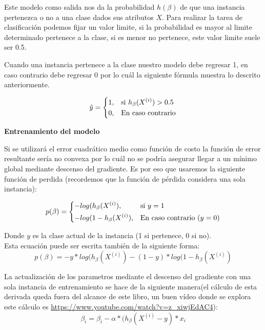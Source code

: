 \documentclass[11pt,fleqn]{book} %
\begin{document}
Este modelo como salida nos da la probabilidad $h(\beta)$ de que una instancia pertenezca o no a una clase dados sus atributos $X$. Para realizar la tarea de clasificación podemos fijar un valor limite, si la probabilidad es mayor al limite determinado pertenece a la clase, si es menor no pertenece, este valor limite suele ser 0.5.

Cuando una instancia pertenece a la clase nuestro modelo debe regresar 1, en caso contrario debe regresar 0 por lo cuál la siguiente fórmula muestra lo descrito anteriormente.

\begin{equation}
\label{eqn:prob_reg_logistica}
    \hat{y} = 
\begin{dcases}
    1,& \text{si } h_\beta(X^{(i)}) > 0.5 \\
    0,& \text{En caso contrario}
\end{dcases} 
\end{equation}

\textbf{Entrenamiento del modelo}

Si se utilizará el error cuadrático medio como función de costo la función de error resultante sería no convexa por lo cuál no se podría asegurar llegar a un mínimo global mediante descenso del gradiente. Es por eso que usaremos la siguiente función de perdida (recordemos que la función de pérdida considera una sola instancia):

\begin{equation}
    p( \beta ) = 
\begin{dcases}
    -log(h_\beta(X^{(i)}),& \text{si } y = 1\\
    -log(1-h_\beta(X^{(i)}),& \text{En caso contrario } (y=0)
\end{dcases} 
\label{eqn:costo_reg_logistica} 
\end{equation}

Donde $y$ es la clase actual de la instancia (1 si pertenece, 0 si no).\\
Esta ecuación puede ser escrita también de la siguiente forma:
\begin{equation}
    p( \beta ) = - y*log(h_\beta(X^{(i)}) - (1-y)*log(1-h_\beta(X^{(i)})
\label{eqn:costo_reg_logistica2} 
\end{equation}

La actualización de los parametros mediante el descenso del gradiente con una sola instancia de entrenamiento se hace de la siguiente manera(el cálculo de esta derivada queda fuera del alcance de este libro, un buen vídeo donde se explora este cálculo es \url{https://www.youtube.com/watch?v=z_xiwjEdAC4}):
\begin{equation}
\label{eqn:logistic_regression_gradient_descent}
\beta_i = \beta_i - \alpha * (h_\beta(X^{(i)}-y)*x_i
\end{equation}
\end{document}
